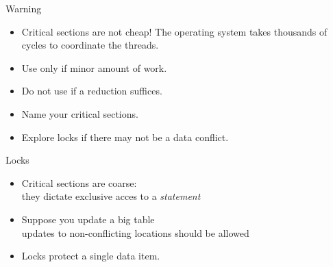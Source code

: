 \begin{frame}{Warning}
  \begin{itemize}
  \item Critical sections are not cheap! The operating system takes
    thousands of cycles to coordinate the threads.
  \item Use only if minor amount of work.
  \item Do not use if a reduction suffices.
  \item Name your critical sections.
  \item Explore locks if there may not be a data conflict.
  \end{itemize}
\end{frame}

\begin{frame}[containsverbatim]{Locks}
  \begin{itemize}
  \item Critical sections are coarse:\\
    they dictate exclusive acces to a \emph{statement}
  \item     Suppose you update a big table\\
    updates to non-conflicting locations should be allowed
  \item Locks protect a single data item.
  \end{itemize}
\end{frame}

\endinput

\begin{frame}[containsverbatim]{}
  \begin{itemize}
  \item 
  \end{itemize}
\end{frame}

\endinput

\begin{frame}[containsverbatim]{}
  \begin{itemize}
  \item 
  \end{itemize}
\end{frame}

